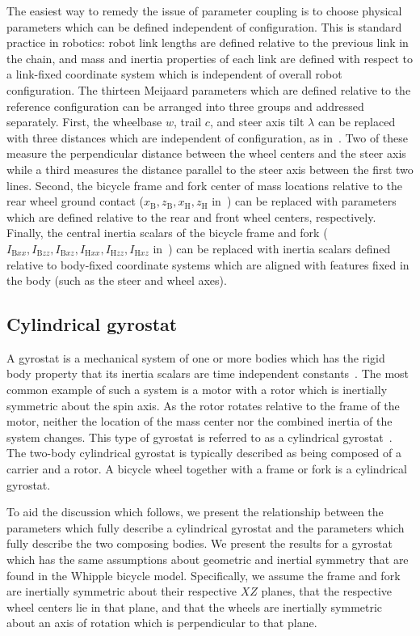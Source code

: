 The easiest way to remedy the issue of parameter coupling is to choose physical
parameters which can be defined independent of configuration. This is standard
practice in robotics: robot link lengths are defined relative to the previous
link in the chain, and mass and inertia properties of each link are defined
with respect to a link-fixed coordinate system which is independent of overall
robot configuration. The thirteen Meijaard parameters which are defined
relative to the reference configuration can be arranged into three groups and
addressed separately. First, the wheelbase $w$, trail $c$, and steer axis tilt
$\lambda$ can be replaced with three distances which are independent of
configuration, as in~\cite{Franke1990}. Two of these measure the perpendicular
distance between the wheel centers and the steer axis while a third measures
the distance parallel to the steer axis between the first two lines. Second,
the bicycle frame and fork center of mass locations relative to the rear wheel
ground contact ($x_\text{B}, z_\text{B}, x_\text{H}, z_\text{H}$
in~\cite{Meijaard2007}) can be replaced with parameters which are defined
relative to the rear and front wheel centers, respectively. Finally, the
central inertia scalars of the bicycle frame and fork ($I_{\text{B}xx},
I_{\text{B}zz}, I_{\text{B}xz}, I_{\text{H}xx}, I_{\text{H}zz}, I_{\text{H}xz}$
in~\cite{Meijaard2007}) can be replaced with inertia scalars defined relative
to body-fixed coordinate systems which are aligned with features fixed in the
body (such as the steer and wheel axes).

\subsection{Cylindrical gyrostat} \label{model:cylindrical_gyrostat}
A gyrostat is a mechanical system of one or more bodies which has the rigid
body property that its inertia scalars are time independent
constants~\cite{Wittenburg2008}. The most common example of such a system is a
motor with a rotor which is inertially symmetric about the spin axis. As the
rotor rotates relative to the frame of the motor, neither the location of the
mass center nor the combined inertia of the system changes. This type of
gyrostat is referred to as a cylindrical gyrostat~\cite{Mitiguy2001}. The
two-body cylindrical gyrostat is typically described as being composed of a
carrier and a rotor. A bicycle wheel together with a frame or fork is a
cylindrical gyrostat.

To aid the discussion which follows, we present the relationship between the
parameters which fully describe a cylindrical gyrostat and the parameters which
fully describe the two composing bodies. We present the results for a gyrostat
which has the same assumptions about geometric and inertial symmetry that are
found in the Whipple bicycle model. Specifically, we assume the frame and fork
are inertially symmetric about their respective $XZ$ planes, that the
respective wheel centers lie in that plane, and that the wheels are inertially
symmetric about an axis of rotation which is perpendicular to that plane.

